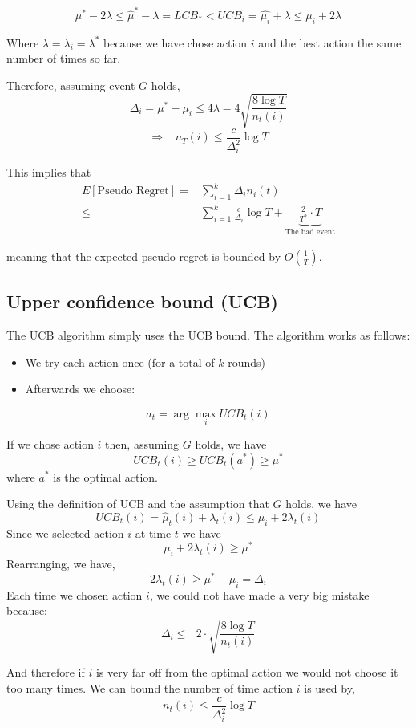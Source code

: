 \[
\mu^{*}-2\lambda\le\hat{\mu}^{*}-\lambda=LCB_{*}<UCB_{i}=\hat{\mu_{i}}+\lambda\leq\mu_{i}+2\lambda
\]

Where $\lambda=\lambda_{i}=\lambda^{*}$ because we have chose action
$i$ and the best action the same number of times so far.

Therefore, assuming event $G$ holds,
\[
\Delta_{i}=\mu^{*}-\mu_{i}\le4\lambda=4\sqrt{\frac{8\log
T}{n_{t}(i)}}
\]
\[
\Rightarrow\;\;\; n_{T}(i)\le\frac{c}{\Delta_{i}^{2}}\log T
\]

This implies that
\begin{align*}
E\left[\text{Pseudo Regret}\right]  = &  \sum_{i=1}^{k}\Delta_{i}n_{i}(t)\\
  \le &  \sum_{i=1}^{k}\frac{c}{\Delta_{i}}\log T
  +\underbrace{\frac{2}{T^{2}}\cdot T}_{\text{The bad event}}
\end{align*}

meaning that the expected pseudo regret is bounded by $O\left(\frac{1}{T}\right)$.

\subsection{Upper confidence bound (UCB)}

The UCB algorithm simply uses the UCB bound. The algorithm works as
follows:
\begin{itemize}
\item We try each action once (for a total of $k$ rounds)
\item Afterwards we choose:
\end{itemize}
\[
a_{t}=\arg\max_{i}UCB_t(i)
\]

If we chose action $i$ then, assuming $G$ holds, we have
\[
UCB_{t}(i)  \ge  UCB_t(a^*)\geq\mu^{*}
\]
where $a^*$ is the optimal action.

Using the definition of UCB and the assumption that $G$ holds, we
have
\[
UCB_t(i)=\hat{\mu}_{t}(i)+\lambda_{t}(i)\le\mu_{i}+2\lambda_{t}(i)
\]
Since we selected action $i$ at time $t$ we have
\[
\mu_{i}+2\lambda_{t}(i)\ge\mu^{*}
\]
Rearranging, we have,
\[
2\lambda_t(i)\ge\mu^{*}-\mu_{i}=\Delta_{i}
\]
Each time we chosen action $i$, we could not have made a very big
mistake because:
\[
\Delta_{i}\leq\text{ }2\cdot\sqrt{\frac{8\log T}{n_{t}(i)}}
\]

And therefore if $i$ is very far off from the optimal action we
would not choose it too many times. We can bound the number of time
action $i$ is used by,
\[
n_{t}(i)\leq\frac{c}{\Delta_{i}^{2}}\log T
\]

